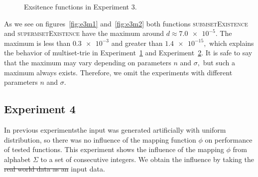 \documentclass[10pt,letterpaper]{article}
\providecommand{\DIFaddtex}[1]{{\protect\color{blue}\uwave{#1}}} %
\providecommand{\DIFdeltex}[1]{{\protect\color{red}\sout{#1}}}                      %
\providecommand{\DIFaddbegin}{} %
\providecommand{\DIFaddend}{} %
\providecommand{\DIFdelbegin}{} %
\providecommand{\DIFdelend}{} %
\providecommand{\DIFadd}[1]{\texorpdfstring{\DIFaddtex{#1}}{#1}} %
\providecommand{\DIFdel}[1]{\texorpdfstring{\DIFdeltex{#1}}{}} %
\newcommand{\DIFscaledelfig}{0.5}
\newlength{\DIFdelgraphicswidth} %
\newlength{\DIFdelgraphicsheight} %
\newcommand{\DIFaddincludegraphics}[2][]{{\color{blue}\fbox{\DIFOincludegraphics[#1]{#2}}}} %
\newcommand{\DIFdelincludegraphics}[2][]{%
\sbox{\DIFdelgraphicsbox}{\DIFOincludegraphics[#1]{#2}}%
\settoboxwidth{\DIFdelgraphicswidth}{\DIFdelgraphicsbox} %
\settoboxtotalheight{\DIFdelgraphicsheight}{\DIFdelgraphicsbox} %
\scalebox{\DIFscaledelfig}{%
\parbox[b]{\DIFdelgraphicswidth}{\usebox{\DIFdelgraphicsbox}\\[-\baselineskip] \rule{\DIFdelgraphicswidth}{0em}}\llap{\resizebox{\DIFdelgraphicswidth}{\DIFdelgraphicsheight}{%
\setlength{\unitlength}{\DIFdelgraphicswidth}%
\begin{picture}(1,1)%
\thicklines\linethickness{2pt} %
{\color[rgb]{1,0,0}\put(0,0){\framebox(1,1){}}}%
{\color[rgb]{1,0,0}\put(0,0){\line( 1,1){1}}}%
{\color[rgb]{1,0,0}\put(0,1){\line(1,-1){1}}}%
\end{picture}%
}\hspace*{3pt}}} %
} %
\DeclareRobustCommand{\DIFaddbegin}{\DIFOaddbegin \let\includegraphics\DIFaddincludegraphics} %
\DeclareRobustCommand{\DIFaddend}{\DIFOaddend \let\includegraphics\DIFOincludegraphics} %
\DeclareRobustCommand{\DIFdelbegin}{\DIFOdelbegin \let\includegraphics\DIFdelincludegraphics} %
\DeclareRobustCommand{\DIFdelend}{\DIFOaddend \let\includegraphics\DIFOincludegraphics} %
\begin{document}
\begin{figure}
\center
{}
\caption{Exsitence functions in Experiment 3.}
\end{figure}

As we see on figures~\ref{fig:e3m1} and~\ref{fig:e3m2} both functions 
\textsc{submsetExistence} and \textsc{supermsetExistence} have the maximum 
around $d\approx \num{7.0e-5}.$ The maximum is less than $\num{0.3e-3}$ and 
greater than $\num{1.4e-15},$ which explains the behavior of multiset-trie in 
Experiment~\hyperref[s:exp1]{1} and Experiment~\hyperref[s:exp2]{2}. It is safe 
to say that the maximum may vary depending on parameters $n$ and $\sigma,$ but 
such a maximum always exists. Therefore, we omit the experiments with different 
parameters $n$ and $\sigma.$


\subsection{Experiment 4} \label{s:exp4}
In previous experiments\DIFaddbegin \DIFadd{, }\DIFaddend the input was generated artificially with uniform 
distribution, so there was no influence of the mapping function $\phi$ on 
\DIFaddbegin \DIFadd{the }\DIFaddend performance of tested functions. This experiment shows the influence of the 
mapping $\phi$ from alphabet $\Sigma$ to a set of consecutive integers. 
We obtain the influence by taking the \DIFdelbegin \DIFdel{real world data as an }\DIFdelend \DIFaddbegin \DIFadd{real-world data as }\DIFaddend input data. 
\end{document}
